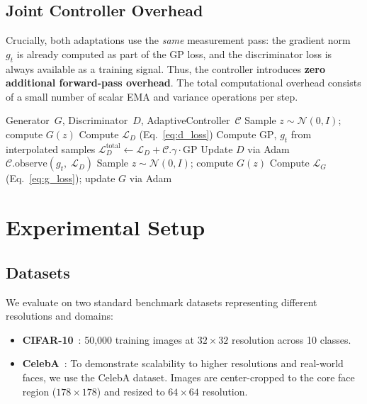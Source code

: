 \documentclass{article}
\newcommand{\ncritic}{n_{\mathrm{critic}}}
\begin{document}
\subsection{Joint Controller Overhead}

Crucially, both adaptations use the \emph{same} measurement pass: the gradient norm~$g_t$ is already computed as part of the GP loss, and the discriminator loss is always available as a training signal. Thus, the controller introduces \textbf{zero additional forward-pass overhead}. The total computational overhead consists of a small number of scalar EMA and variance operations per step.

\begin{algorithm}[t]
\caption{AdaRpGAN Training Loop (per epoch)}
\label{alg:adarppgan}
\let\AND\relax
\begin{algorithmic}[1]
\REQUIRE Generator~$G$, Discriminator~$D$, AdaptiveController~$\mathcal{C}$
    \FOR{$k = 1$ to $\mathcal{C}.\ncritic$}
        \STATE Sample $z \sim \mathcal{N}(0, I)$; compute $G(z)$
        \STATE Compute $\mathcal{L}_D$ (Eq.~\ref{eq:d_loss})
        \STATE Compute $\mathrm{GP}$, $g_t$ from interpolated samples
        \STATE $\mathcal{L}_{D}^{\mathrm{total}} \leftarrow \mathcal{L}_D + \mathcal{C}.\gamma \cdot \mathrm{GP}$
        \STATE Update $D$ via Adam
        \STATE $\mathcal{C}.\mathrm{observe}(g_t,\; \mathcal{L}_D)$ \hfill\COMMENT{update $\gamma, \ncritic$}
    \ENDFOR
    \STATE Sample $z \sim \mathcal{N}(0, I)$; compute $G(z)$
    \STATE Compute $\mathcal{L}_G$ (Eq.~\ref{eq:g_loss}); update $G$ via Adam
\ENDFOR
\end{algorithmic}
\end{algorithm}


\section{Experimental Setup}
\label{sec:experiments}

\subsection{Datasets}

We evaluate on two standard benchmark datasets representing different resolutions and domains:
\begin{itemize}
    \item \textbf{CIFAR-10}~\cite{krizhevsky2009learning}: 50{,}000 training images at $32{\times}32$ resolution across 10 classes.
    \item \textbf{CelebA}~\cite{liu2015faceattributes}: To demonstrate scalability to higher resolutions and real-world faces, we use the CelebA dataset. Images are center-cropped to the core face region ($178{\times}178$) and resized to $64{\times}64$ resolution.
\end{itemize}
\end{document}
